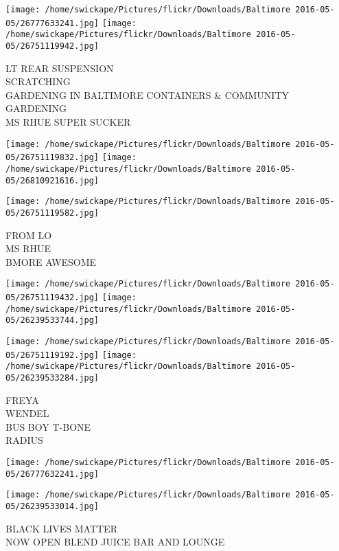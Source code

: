 \documentclass[10pt,letterpaper]{article}
\begin{document}
\texttt{[image: /home/swickape/Pictures/flickr/Downloads/Baltimore 2016-05-05/26777633241.jpg]}
\texttt{[image: /home/swickape/Pictures/flickr/Downloads/Baltimore 2016-05-05/26751119942.jpg]}

LT REAR SUSPENSION\\
SCRATCHING\\
GARDENING IN BALTIMORE CONTAINERS \& COMMUNITY GARDENING\\
MS RHUE SUPER SUCKER\\
\pagebreak

\texttt{[image: /home/swickape/Pictures/flickr/Downloads/Baltimore 2016-05-05/26751119832.jpg]}
\texttt{[image: /home/swickape/Pictures/flickr/Downloads/Baltimore 2016-05-05/26810921616.jpg]}

\vspace{0.25in}
\texttt{[image: /home/swickape/Pictures/flickr/Downloads/Baltimore 2016-05-05/26751119582.jpg]}

FROM LO\\
MS RHUE\\
BMORE AWESOME\\
\pagebreak

\texttt{[image: /home/swickape/Pictures/flickr/Downloads/Baltimore 2016-05-05/26751119432.jpg]}
\texttt{[image: /home/swickape/Pictures/flickr/Downloads/Baltimore 2016-05-05/26239533744.jpg]}

\texttt{[image: /home/swickape/Pictures/flickr/Downloads/Baltimore 2016-05-05/26751119192.jpg]}
\texttt{[image: /home/swickape/Pictures/flickr/Downloads/Baltimore 2016-05-05/26239533284.jpg]}

FREYA\\
WENDEL\\
BUS BOY T{-}BONE\\
RADIUS\\
\pagebreak

\texttt{[image: /home/swickape/Pictures/flickr/Downloads/Baltimore 2016-05-05/26777632241.jpg]}

\vspace{0.25in}
\texttt{[image: /home/swickape/Pictures/flickr/Downloads/Baltimore 2016-05-05/26239533014.jpg]}

BLACK LIVES MATTER\\
NOW OPEN BLEND JUICE BAR AND LOUNGE\\
\pagebreak
\end{document}
